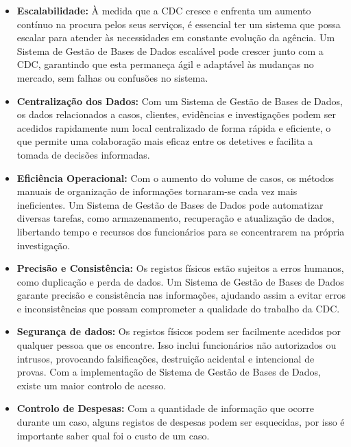\documentclass[a4paper,12pt]{scrreprt}
\begin{document}
    \begin{itemize}
        \item \textbf{Escalabilidade:} À medida que a CDC cresce e enfrenta um aumento contínuo na procura pelos
            seus serviços, é essencial ter um sistema que possa escalar para atender às necessidades em constante
            evolução da agência. Um Sistema de Gestão de Bases de Dados escalável pode crescer junto com a CDC, garantindo que
            esta permaneça ágil e adaptável às mudanças no mercado, sem falhas ou confusões no sistema.
            
        \item \textbf{Centralização dos Dados:} Com um Sistema de Gestão de Bases de Dados, os dados relacionados a
            casos, clientes, evidências e investigações podem ser acedidos rapidamente num local centralizado de
            forma rápida e eficiente, o que permite uma colaboração mais eficaz entre os detetives e facilita a
            tomada de decisões informadas.
            
        \item\textbf{Eficiência Operacional:} Com o aumento do volume de casos, os métodos manuais de organização de informações tornaram-se cada vez mais ineficientes. Um Sistema de Gestão de Bases de Dados pode automatizar diversas tarefas, como armazenamento, recuperação e atualização de dados, libertando tempo e recursos dos funcionários para se concentrarem na própria investigação.
            
            
        \item \textbf{Precisão e Consistência:} Os registos físicos estão sujeitos a erros humanos, como duplicação e perda de dados. Um Sistema de Gestão de Bases de Dados garante precisão e consistência nas informações, ajudando assim a evitar erros e inconsistências que possam comprometer a qualidade do trabalho da CDC.

        \item \textbf{Segurança de dados:} Os registos físicos podem ser facilmente acedidos por qualquer pessoa
            que os encontre. Isso inclui funcionários não autorizados ou intrusos, provocando falsificações, destruição
            acidental e intencional de provas. Com a implementação de Sistema de Gestão de Bases de Dados, existe um maior
            controlo de acesso.
            
        \item \textbf{Controlo de Despesas:} Com a quantidade de informação que ocorre durante um caso, alguns registos de despesas podem ser esquecidas, por isso é importante saber qual foi o custo de um caso.
    \end{itemize}
\end{document}
